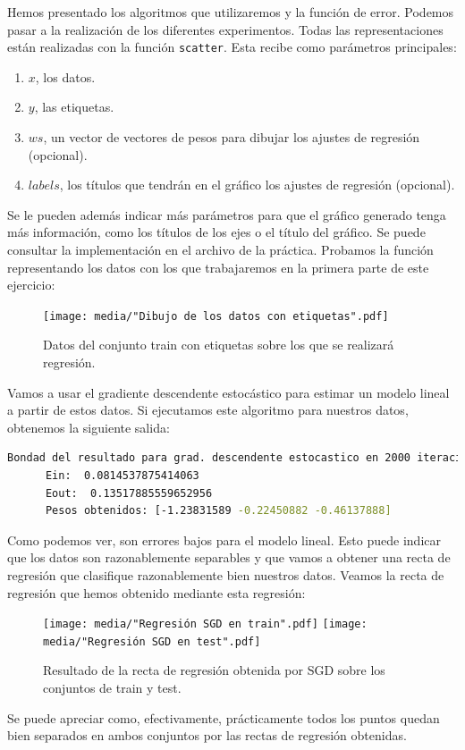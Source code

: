 \documentclass[12pt]{scrartcl}
\begin{document}
{Hemos presentado los algoritmos que utilizaremos y la función de error. Podemos pasar a la realización de los diferentes experimentos. Todas las representaciones están realizadas con la función \lstinline{scatter}. Esta recibe como parámetros principales:
\begin{enumerate}
\item $x$, los datos.
\item $y$, las etiquetas.
\item $ws$, un vector de vectores de pesos para dibujar los ajustes de regresión (opcional).
\item $labels$, los títulos que tendrán en el gráfico los ajustes de regresión (opcional).
\end{enumerate}
Se le pueden además indicar más parámetros para que el gráfico generado tenga más información, como los títulos de los ejes o el título del gráfico. Se puede consultar la implementación en el archivo de la práctica. Probamos la función representando los datos con los 
que trabajaremos en la primera parte de este ejercicio: 
\begin{figure}[H]
  \centering
  \texttt{[image: media/"Dibujo de los datos con etiquetas".pdf]}
  \caption{Datos del conjunto train con etiquetas sobre los que se realizará regresión.}
\end{figure}

Vamos a usar el gradiente descendente estocástico para estimar un modelo lineal a partir de estos datos. 
Si ejecutamos este algoritmo para nuestros datos,  obtenemos la siguiente salida:
\begin{lstlisting}[language=bash]
  Bondad del resultado para grad. descendente estocastico en 2000 iteraciones:
      Ein:  0.0814537875414063
      Eout:  0.13517885559652956
      Pesos obtenidos: [-1.23831589 -0.22450882 -0.46137888]
\end{lstlisting}
Como podemos ver, son errores bajos para el modelo lineal. Esto puede indicar que los datos son razonablemente separables y que vamos a obtener una recta de regresión que clasifique razonablemente bien nuestros datos. 
Veamos la recta de regresión que hemos obtenido mediante esta regresión:
\begin{figure}[H]
  \centering
  \texttt{[image: media/"Regresión SGD en train".pdf]}
  \texttt{[image: media/"Regresión SGD en test".pdf]}
  \caption{Resultado de la recta de regresión obtenida por SGD sobre los conjuntos de train y test.}
\end{figure}
Se puede apreciar como, efectivamente, prácticamente todos los puntos quedan bien separados en ambos conjuntos por las rectas de regresión
obtenidas.\\

}
\end{document}
